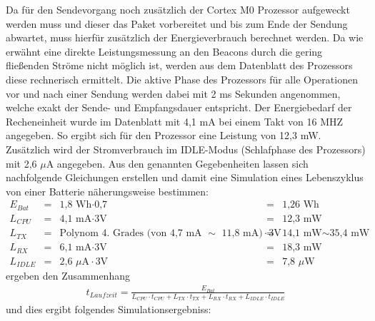 Da für den Sendevorgang noch zusätzlich der Cortex M0 Prozessor aufgeweckt werden muss und dieser das Paket vorbereitet und bis zum Ende der Sendung abwartet, muss hierfür zusätzlich der Energieverbrauch berechnet werden. Da wie erwähnt eine direkte Leistungsmessung an den Beacons durch die gering fließenden Ströme nicht möglich ist, werden aus dem Datenblatt des Prozessors diese rechnerisch ermittelt. Die aktive Phase des Prozessors für alle Operationen vor und nach einer Sendung werden dabei mit 2 ms Sekunden angenommen, welche exakt der Sende- und Empfangsdauer entspricht. Der Energiebedarf der Recheneinheit wurde im Datenblatt mit 4,1 mA bei einem Takt von 16 MHZ angegeben. So ergibt sich für den Prozessor eine Leistung von 12,3 mW. Zusätzlich wird der Stromverbrauch im IDLE-Modus (Schlafphase des Prozessors) mit 2,6 $\mu$A angegeben. Aus den genannten Gegebenheiten lassen sich nachfolgende Gleichungen erstellen und damit eine Simulation eines Lebenszyklus von einer Batterie näherungsweise bestimmen:
\begin{align*}
E_{Bat} &=& \text{1,8 Wh} \cdot \text{0,7} &=& \text{1,26 Wh}\\
L_{CPU} &=& \text{4,1 mA} \cdot \text{3V} &=& \text{12,3 mW}\\
L_{TX} &=& \text{Polynom 4. Grades (von 4,7 mA }\sim\text{ 11,8 mA)} \cdot \text{3V} &=& \text{14,1 mW} \sim \text{35,4 mW}\\
L_{RX} &=& \text{6,1 mA} \cdot \text{3V} &=& \text{18,3 mW}\\
L_{IDLE} &=& \text{2,6 } \mu\text{A} \cdot \text{3V} &=& \text{7,8 } \mu\text{W}
\end{align*}
ergeben den Zusammenhang
\begin{align*}
t_{Laufzeit} = \frac{E_{Bat}}{L_{CPU}\cdot t_{CPU} + L_{TX}\cdot t_{TX} + L_{RX}\cdot t_{RX} + L_{IDLE}\cdot t_{IDLE}} 
\end{align*}
und dies ergibt folgendes Simulationsergebniss:
